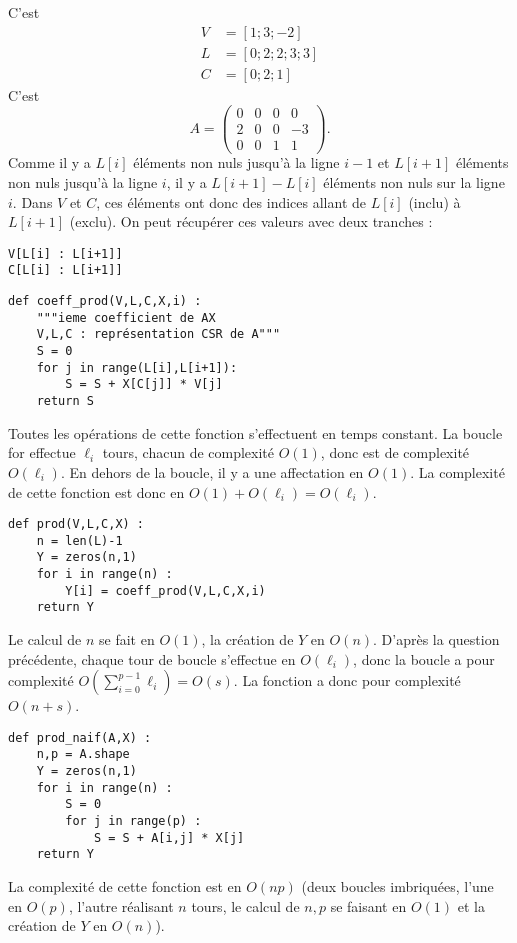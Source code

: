 \question{} C'est 
\begin{align*}
    V &= [1 ; 3 ; -2 ] \\
    L &= [0 ; 2 ; 2 ; 3 ; 3] \\
    C &= [0 ; 2 ; 1 ]
\end{align*}
\question{} C'est 
\begin{equation*}
    A = \begin{pmatrix} 0 & 0 & 0 & 0 \\ 2 & 0 & 0 & -3 \\ 0 & 0 & 1 & 1 \end{pmatrix}. 
\end{equation*}
\question{} Comme il y a $L[i]$ éléments non nuls jusqu'à la ligne \no$i-1$ et $L[i+1]$ éléments non nuls jusqu'à la ligne \no$i$, il y a $L[i+1] - L[i]$ éléments non nuls sur la ligne \no$i$.
Dans $V$ et $C$, ces éléments ont donc des indices allant de $L[i]$ (inclu) à $L[i+1]$ (exclu). On peut récupérer ces valeurs avec deux tranches : 
\begin{verbatim}
V[L[i] : L[i+1]]
C[L[i] : L[i+1]]
\end{verbatim}
\question{}
\begin{verbatim}
def coeff_prod(V,L,C,X,i) : 
    """ieme coefficient de AX
    V,L,C : représentation CSR de A"""
    S = 0
    for j in range(L[i],L[i+1]):
        S = S + X[C[j]] * V[j]
    return S
\end{verbatim}
Toutes les opérations de cette fonction s'effectuent en temps constant. La boucle for effectue $\ell_i$ tours, chacun de complexité $O(1)$, donc est de complexité $O(\ell_i)$. 
En dehors de la boucle, il y a une affectation en $O(1)$. 
La complexité de cette fonction est donc en $O(1) + O(\ell_i) = O(\ell_i)$. 

\question{} 
\begin{verbatim}
def prod(V,L,C,X) : 
    n = len(L)-1
    Y = zeros(n,1)
    for i in range(n) : 
        Y[i] = coeff_prod(V,L,C,X,i)
    return Y
\end{verbatim}
Le calcul de $n$ se fait en $O(1)$, la création de $Y$ en $O(n)$. 
D'après la question précédente, chaque tour de boucle s'effectue en $O(\ell_i)$, donc la boucle a pour complexité $O(\sum_{i=0}^{p-1}\ell_i) = O(s)$. 
La fonction a donc pour complexité $O(n+s)$. 

\question{}
\begin{verbatim}
def prod_naif(A,X) : 
    n,p = A.shape
    Y = zeros(n,1)
    for i in range(n) : 
        S = 0
        for j in range(p) : 
            S = S + A[i,j] * X[j]
    return Y
\end{verbatim}
La complexité de cette fonction est en $O(np)$ (deux boucles imbriquées, l'une en $O(p)$, l'autre réalisant $n$ tours, le calcul de $n,p$ se faisant en $O(1)$ et la création de $Y$ en $O(n)$).

